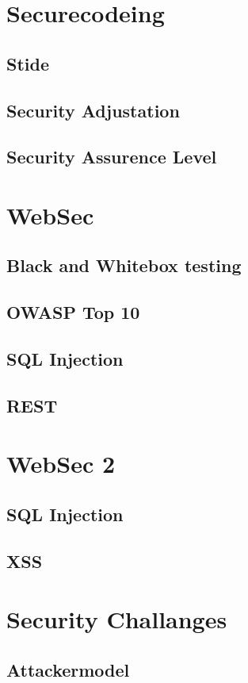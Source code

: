 \documentclass[a4paper, 12pt]{article}
\begin{document}
\section{Securecodeing}
\subsection{Stide}
\subsection{Security Adjustation}
\subsection{Security Assurence Level}

\section{WebSec}
\subsection{Black and Whitebox testing}
\subsection{OWASP Top 10}
\subsection{SQL Injection}
\subsection{REST}

\section{WebSec 2}
\subsection{SQL Injection}
\subsection{XSS}

\section{Security Challanges}
\subsection{Attackermodel}
\end{document}
